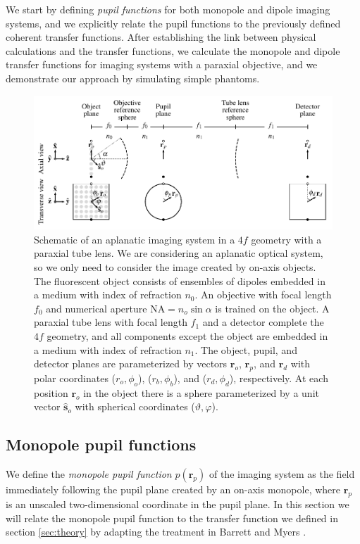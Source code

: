 \documentclass[]{osa-article}
\providecommand{\ro}{\mathbf{\mathbf{r}}_o}
\providecommand{\so}{\mathbf{\hat{s}}_o}
\providecommand{\rp}{\mathbf{r}_p}
\providecommand{\rd}{\mathbf{r}_d}
\begin{document}
We start by defining \textit{pupil functions} for both monopole and dipole
imaging systems, and we explicitly relate the pupil functions to the previously
defined coherent transfer functions. After establishing the link between
physical calculations and the transfer functions, we calculate the monopole and
dipole transfer functions for imaging systems with a paraxial objective, and we
demonstrate our approach by simulating simple phantoms. 

\begin{figure}[h]
 \centering
   \centering
   \includegraphics[width = 1.0\textwidth]{../figures/coordinates/detection-coords.pdf}
   \caption{Schematic of an aplanatic imaging system in a $4f$ geometry with a
     paraxial tube lens. We are considering an aplanatic optical system, so we
     only need to consider the image created by on-axis objects. The fluorescent
     object consists of ensembles of dipoles embedded in a medium with index of
     refraction $n_0$. An objective with focal length $f_0$ and numerical
     aperture $\text{NA} = n_o\sin\alpha$ is trained on the object. A paraxial
     tube lens with focal length $f_1$ and a detector complete the $4f$
     geometry, and all components except the object are embedded in a medium
     with index of refraction $n_1$. The object, pupil, and detector planes are
     parameterized by vectors $\ro$, $\rp$, and $\rd$ with polar coordinates
     ($r_o, \phi_o$), ($r_b, \phi_b$), and ($r_d, \phi_d$), respectively. At
     each position $\ro$ in the object there is a sphere parameterized by a unit
     vector $\so$ with spherical coordinates ($\vartheta, \varphi$). }
   \label{fig:schematic}
 \end{figure}

\subsection{Monopole pupil functions}
We define the \textit{monopole pupil function} $p(\rp)$ of the imaging system as
the field immediately following the pupil plane created by an on-axis monopole,
where $\rp$ is an unscaled two-dimensional coordinate in the pupil plane. In
this section we will relate the monopole pupil function to the transfer function
we defined in section \ref{sec:theory} by adapting the treatment in Barrett and
Myers \cite[ch.~9.7]{barrett2004}.
\end{document}
